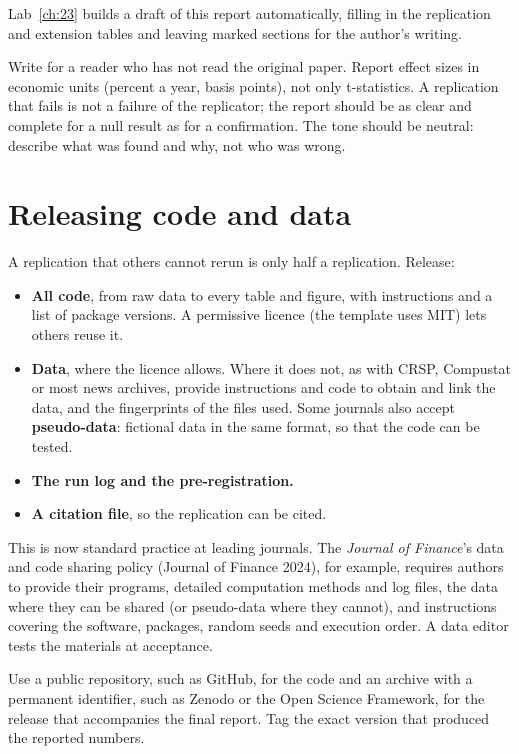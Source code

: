 Lab~\ref{ch:23} builds a draft of this report automatically, filling in the replication and extension tables and leaving marked sections for the author's writing.

Write for a reader who has not read the original paper. Report effect sizes in economic units (percent a year, basis points), not only t-statistics. A replication that fails is not a failure of the replicator; the report should be as clear and complete for a null result as for a confirmation. The tone should be neutral: describe what was found and why, not who was wrong.

\section{Releasing code and data}
\label{sec:24-release}

A replication that others cannot rerun is only half a replication. Release:

\begin{itemize}
  \item \textbf{All code}, from raw data to every table and figure, with instructions and a list of package versions. A permissive licence (the template uses MIT) lets others reuse it.
  \item \textbf{Data}, where the licence allows. Where it does not, as with CRSP, Compustat or most news archives, provide instructions and code to obtain and link the data, and the fingerprints of the files used. Some journals also accept \textbf{pseudo-data}: fictional data in the same format, so that the code can be tested.
  \item \textbf{The run log and the pre-registration.}
  \item \textbf{A citation file}, so the replication can be cited.
\end{itemize}

This is now standard practice at leading journals. The \emph{Journal of Finance}'s data and code sharing policy (Journal of Finance 2024), for example, requires authors to provide their programs, detailed computation methods and log files, the data where they can be shared (or pseudo-data where they cannot), and instructions covering the software, packages, random seeds and execution order. A data editor tests the materials at acceptance.

Use a public repository, such as GitHub, for the code and an archive with a permanent identifier, such as Zenodo or the Open Science Framework, for the release that accompanies the final report. Tag the exact version that produced the reported numbers.

